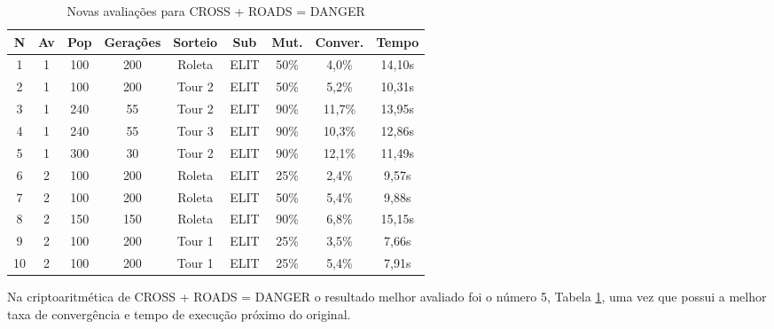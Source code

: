 \documentclass[a4paper, 12pt]{article}
\begin{document}
  \begin{table}[H]
    \centering
    \begin{tabular}{|c|c|c|c|c|c|c|c|c|}
      \hline
      N & Av & Pop & Gerações & Sorteio & Sub & Mut. & Conver. & Tempo  \\
      \hline
      1 & 1 & 100 & 200 & Roleta & ELIT & 50\% &4,0\% & 14,10s \\
      \hline
      2&1 & 100 & 200 & Tour 2 & ELIT & 50\% &5,2\% & 10,31s \\
      \hline
      3&1 & 240 & 55 & Tour 2 & ELIT & 90\% &11,7\% & 13,95s \\
      \hline
      4&1 & 240 & 55 & Tour 3 & ELIT & 90\% &10,3\% & 12,86s \\
      \hline
      5&1 & 300 & 30 & Tour 2 & ELIT & 90\% &12,1\% & 11,49s \\
      \hline
      6&2 & 100 & 200 & Roleta & ELIT & 25\% &2,4\% & 9,57s \\
      \hline
      7&2 & 100 & 200 & Roleta & ELIT & 50\% &5,4\% & 9,88s \\
      \hline
      8&2 & 150 & 150 & Roleta & ELIT & 90\% &6,8\% & 15,15s \\
      \hline
      9&2 & 100 & 200 & Tour 1 & ELIT & 25\% &3,5\% & 7,66s \\
      \hline
      10&2 & 100 & 200 & Tour 1 & ELIT & 25\% &5,4\% & 7,91s \\
      \hline
    \end{tabular}
    \caption{Novas avaliações para CROSS + ROADS = DANGER}
    \label{tab:cross}
  \end{table}

  Na criptoaritmética de CROSS + ROADS = DANGER o resultado melhor avaliado
  foi o número 5, Tabela \ref{tab:cross}, uma vez que possui a melhor taxa de
  convergência e tempo de execução próximo do original.
\end{document}
